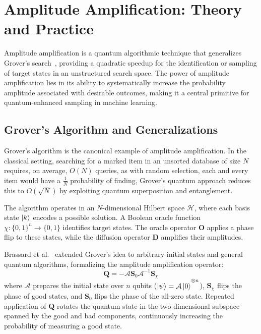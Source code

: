 \documentclass[encoding=utf8,british]{tumphthesis}
\begin{document}
    \section{Amplitude Amplification: Theory and Practice}
    \label{sect:QSA_AA}
    Amplitude amplification is a quantum algorithmic technique that generalizes Grover's search~\cite{Grover}, providing a quadratic 
    speedup for the identification or sampling of target states in an unstructured search space. The power of amplitude 
    amplification lies in its ability to systematically increase the probability amplitude associated with desirable outcomes, 
    making it a central primitive for quantum-enhanced sampling in machine learning.

        \subsection{Grover’s Algorithm and Generalizations}

        Grover’s algorithm is the canonical example of amplitude amplification. In the classical setting, searching for a marked item in an 
        unsorted database of size $N$ requires, on average, $O(N)$ queries, as with random selection, each and every item would have a 
        $\frac{1}{N}$ probability of finding, Grover’s quantum approach reduces this to $O(\sqrt{N})$ by exploiting quantum superposition 
        and entanglement.

        The algorithm operates in an $N$-dimensional Hilbert space $\mathcal{H}$, where each basis state $\left|k\right>$ encodes a possible 
        solution. A Boolean oracle function $\chi: \{0,1\}^n \rightarrow \{0,1\}$ identifies target states. The oracle operator $\mathbf{O}$ 
        applies a phase flip to these states, while the diffusion operator $\mathbf{D}$ amplifies their amplitudes.

        Brassard et al.~\cite{Brassard_2002} extended Grover’s idea to arbitrary initial states and general quantum algorithms, formalizing the amplitude amplification operator:
        \begin{equation*}
        \mathbf{Q} = -\mathcal{A} \mathbf{S}_0 \mathcal{A}^{-1} \mathbf{S}_\chi
        \end{equation*}
        where $\mathcal{A}$ prepares the initial state over $n$ qubits ($\left|\psi\right> = \mathcal{A}\left|0\right>^{\mathbin{\mathop{\otimes}\limits_{}}n}$), $\mathbf{S}_\chi$ flips the phase of good states, and $\mathbf{S}_0$ flips the phase of the all-zero state. Repeated 
        application of $\mathbf{Q}$ rotates the quantum state in the two-dimensional subspace spanned by the good and bad components, continuously increasing the probability 
        of measuring a good state.
\end{document}
